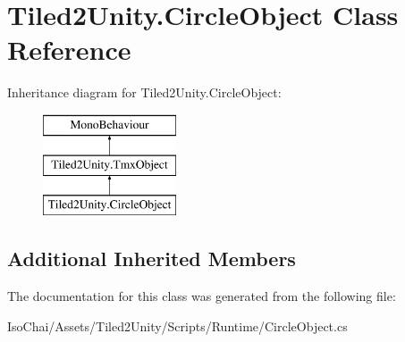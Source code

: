 \hypertarget{class_tiled2_unity_1_1_circle_object}{}\section{Tiled2\+Unity.\+Circle\+Object Class Reference}
\label{class_tiled2_unity_1_1_circle_object}
Inheritance diagram for Tiled2\+Unity.\+Circle\+Object\+:\begin{figure}[H]
\begin{center}
\leavevmode
\includegraphics[height=3.000000cm]{class_tiled2_unity_1_1_circle_object}
\end{center}
\end{figure}
\subsection*{Additional Inherited Members}


The documentation for this class was generated from the following file\+:\begin{DoxyCompactItemize}
\item 
Iso\+Chai/\+Assets/\+Tiled2\+Unity/\+Scripts/\+Runtime/Circle\+Object.\+cs\end{DoxyCompactItemize}
